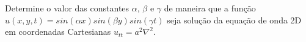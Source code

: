 \linespread{1.5}

Determine o valor das constantes $\alpha$, $\beta$ e $\gamma$ de maneira que a função $u(x, y, t) = sin(\alpha x)sin(\beta y)sin(\gamma t)$ seja solução da equação de onda 2D em coordenadas Cartesianas $u_{tt} = a^2 \nabla^2$.